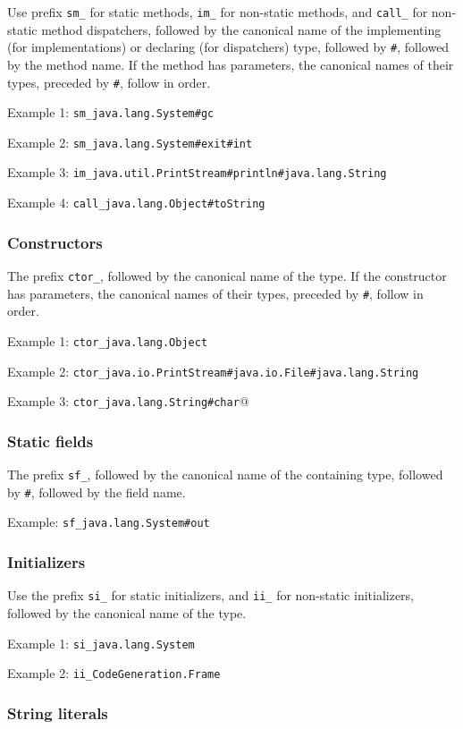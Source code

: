 \documentclass[12pt]{article}
\newcommand{\code}[1]{\texttt{#1}}
\begin{document}
Use prefix \code{sm\_} for static methods, \code{im\_} for non-static methods, and \code{call\_} for non-static method dispatchers, followed by the canonical name of the implementing (for implementations) or declaring (for dispatchers) type, followed by \code{\#}, followed by the method name. If the method has parameters, the canonical names of their types, preceded by \code{\#}, follow in order.

Example 1: \code{sm\_java.lang.System\#gc}

Example 2: \code{sm\_java.lang.System\#exit\#int} 

Example 3: \code{im\_java.util.PrintStream\#println\#java.lang.String}

Example 4: \code{call\_java.lang.Object\#toString} 

\subsubsection{Constructors}

The prefix \code{ctor\_}, followed by the canonical name of the type. If the constructor has parameters, the canonical names of their types, preceded by \code{\#}, follow in order.

Example 1: \code{ctor\_java.lang.Object} 

Example 2: \code{ctor\_java.io.PrintStream\#java.io.File\#java.lang.String}

Example 3: \code{ctor\_java.lang.String\#char$@$}

\subsubsection{Static fields}
The prefix \code{sf\_}, followed by the canonical name of the containing type, followed by \code{\#}, followed by the field name.

Example: \code{sf\_java.lang.System\#out}

\subsubsection{Initializers}

Use the prefix \code{si\_} for static initializers, and \code{ii\_} for non-static initializers, followed by the canonical name of the type.

Example 1: \code{si\_java.lang.System} 

Example 2: \code{ii\_CodeGeneration.Frame}

\subsubsection{String literals}
\end{document}
